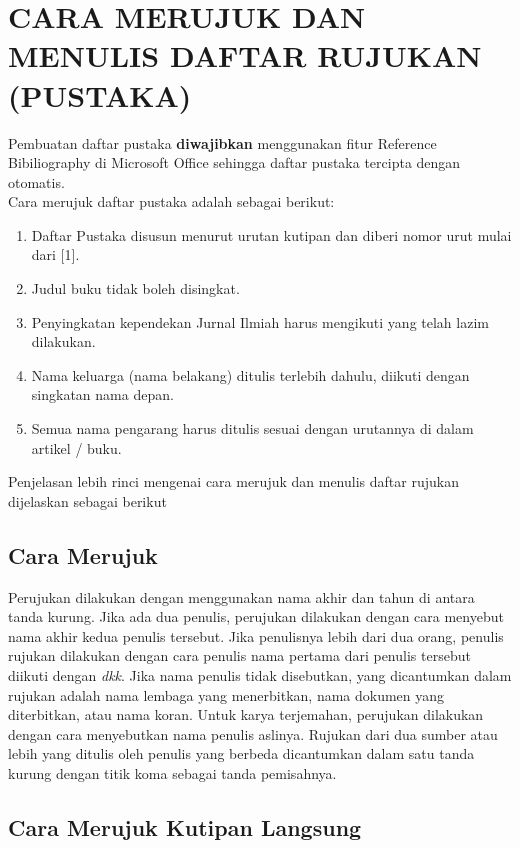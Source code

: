 \chapter{CARA MERUJUK DAN MENULIS DAFTAR RUJUKAN (PUSTAKA)}
Pembuatan	daftar	pustaka \textbf{diwajibkan} menggunakan	 fitur	Reference	Bibiliography	di	Microsoft Office	sehingga	daftar	pustaka	tercipta	dengan	otomatis.\\
Cara	merujuk	daftar	pustaka	adalah	sebagai	berikut:
\begin{enumerate}
\item Daftar	Pustaka	disusun	menurut	urutan	kutipan	dan	diberi nomor	urut	mulai	dari	[1].
\item Judul	buku	tidak	boleh	disingkat.
\item Penyingkatan	kependekan	Jurnal	Ilmiah	harus	mengikuti	yang	telah	lazim	dilakukan.
\item Nama	keluarga	(nama	belakang)	ditulis	terlebih	dahulu,	diikuti	dengan	singkatan	nama	depan.
\item Semua	nama	pengarang	harus	ditulis	sesuai	dengan	urutannya	di		dalam	artikel	/	buku.
\end{enumerate}

\par Penjelasan	lebih	rinci	mengenai	cara	merujuk	dan	menulis	daftar	rujukan	dijelaskan	sebagai	
berikut

\section{Cara	Merujuk}
Perujukan	 dilakukan	 dengan	menggunakan	 nama	 	 akhir	 dan	 tahun	 di	 antara	 tanda	 kurung. Jika	ada	dua	penulis,	perujukan	dilakukan	dengan	cara	menyebut	nama	akhir	kedua	penulis	
tersebut.	Jika	penulisnya	lebih	dari	dua	orang,	penulis	rujukan	dilakukan	dengan	cara	penulis	nama	pertama	dari	penulis	 tersebut	diikuti	dengan \textit{dkk}. Jika	nama	penulis	 tidak	disebutkan,	yang	 dicantumkan	 dalam	 rujukan	 adalah	 nama	lembaga	 yang	menerbitkan,	 nama	 dokumen yang diterbitkan,	 atau	 nama	 koran.	 Untuk	 karya	 terjemahan,	 perujukan	 dilakukan	 dengan	cara	menyebutkan	nama	penulis	aslinya.	Rujukan	dari	dua	sumber	atau lebih	yang	ditulis	oleh penulis	yang	berbeda	dicantumkan	dalam	satu	tanda	kurung	dengan	titik	koma	sebagai	tanda	pemisahnya.

\section{Cara	Merujuk	Kutipan	Langsung}
